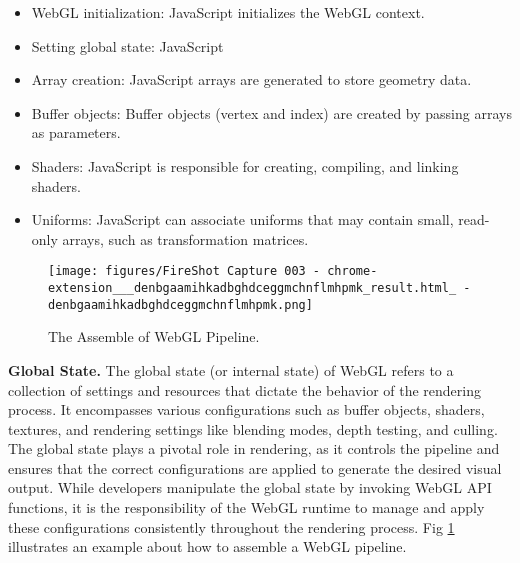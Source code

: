 \begin{itemize}
    \item WebGL initialization: JavaScript initializes the WebGL context.
    \item Setting global state: JavaScript 
    \item Array creation: JavaScript arrays are generated to store geometry data.
    \item Buffer objects: Buffer objects (vertex and index) are created by passing arrays as parameters.
    \item Shaders: JavaScript is responsible for creating, compiling, and linking shaders.
    \item Uniforms: JavaScript can associate uniforms that may contain small, read-only arrays, such as transformation matrices.
\end{itemize}

\begin{figure}[tp]
\centering
\texttt{[image: figures/FireShot Capture 003 - chrome-extension\_\_\_denbgaamihkadbghdceggmchnflmhpmk\_result.html\_ - denbgaamihkadbghdceggmchnflmhpmk.png]}
\caption{The Assemble of WebGL Pipeline.}\label{fig_assemble}
\end{figure}

\textbf{Global State.} The global state (or internal state) of WebGL refers to a collection of settings and resources that dictate the behavior of the rendering process. It encompasses various configurations such as buffer objects, shaders, textures, and rendering settings like blending modes, depth testing, and culling. The global state plays a pivotal role in rendering, as it controls the pipeline and ensures that the correct configurations are applied to generate the desired visual output. While developers manipulate the global state by invoking WebGL API functions, it is the responsibility of the WebGL runtime to manage and apply these configurations consistently throughout the rendering process. Fig \ref{fig_assemble} illustrates an example about how to assemble a WebGL pipeline. 


